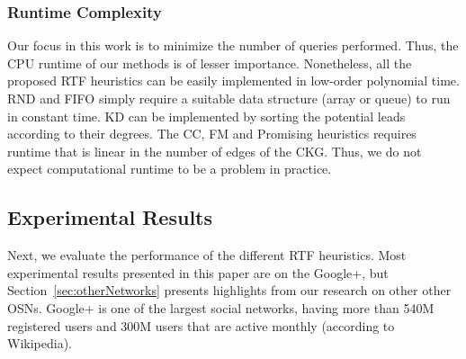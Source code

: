 \documentclass[journal]{IEEEtran}
\newcommand{\newstuff}[1]{#1}
\begin{document}
\newstuff{
\subsubsection{Runtime Complexity}
Our focus in this work is to minimize the number of queries performed. Thus, the CPU runtime of our methods is of lesser importance. Nonetheless, all the proposed RTF heuristics can be 
easily implemented in low-order polynomial time. 
RND and FIFO simply require a suitable data structure (array or queue) to run in constant time. KD can be implemented by sorting the potential leads according to their degrees. 
The CC, FM and Promising heuristics requires runtime that is linear in the number of edges of the CKG. 
Thus, we do not expect computational runtime to be a problem in practice.}

\subsection{Experimental Results}
\label{sec:btf-experimentalResults}
Next, we evaluate the performance of the different RTF heuristics. Most experimental results presented in this paper are on the Google+, but Section~\ref{sec:otherNetworks} presents highlights from our research on other other OSNs. Google+ is one of the largest social networks, having more than 540M registered users and 300M users that are active monthly (according to Wikipedia). 



\end{document}
